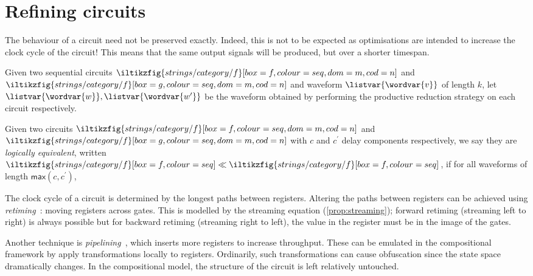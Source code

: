 \section{Refining circuits}

The behaviour of a circuit need not be preserved exactly.
Indeed, this is not to be expected as optimisations are intended to increase the
clock cycle of the circuit!
This means that the same output signals will be produced, but over a shorter
timespan.

\begin{definition}
    Given two sequential circuits \(
    \iltikzfig{strings/category/f}[box=f,colour=seq,dom=m,cod=n]
    \) and \(
    \iltikzfig{strings/category/f}[box=g,colour=seq,dom=m,cod=n]
    \) and waveform \(\listvar{\wordvar{v}}\) of length \(k\), let
    \(\listvar{\wordvar{w}},\listvar{\wordvar{w^\prime}}\) be the waveform
    obtained by performing the productive reduction strategy on each circuit
    respectively.
\end{definition}

\begin{definition}
    Given two circuits \(
    \iltikzfig{strings/category/f}[box=f,colour=seq,dom=m,cod=n]
    \) and \(
    \iltikzfig{strings/category/f}[box=g,colour=seq,dom=m,cod=n]
    \) with \(c\) and \(c^\prime\) delay components respectively, we say they
    are \emph{logically equivalent}, written \(
    \iltikzfig{strings/category/f}[box=f,colour=seq]
    \ll
    \iltikzfig{strings/category/f}[box=f,colour=seq]
    \), if for all waveforms of length \(\mathsf{max}(c,c^\prime)\),


\end{definition}

\begin{example}[Retiming]
    The clock cycle of a circuit is determined by the longest paths between
    registers. Altering the paths between registers can be achieved using
    \emph{retiming}~\cite{leiserson1991retiming}: moving registers across gates.
    This is modelled by the streaming equation (\cref{prop:streaming});
    forward retiming (streaming left to right) is always possible
    but for backward retiming (streaming right to left), the value
    in the register must be in the image of the gates.
\end{example}

\begin{example}[Pipelining]
    Another technique is \emph{pipelining}~\cite{parhi1999vlsi}, which inserts
    more registers to increase throughput.
    These can be emulated in the compositional framework by apply
    transformations locally to registers.
    Ordinarily, such transformations can cause obfuscation since the state space
    dramatically changes. In the compositional model, the structure of the
    circuit is left relatively untouched.
\end{example}

